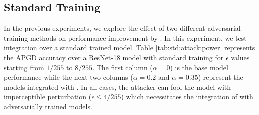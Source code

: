 \documentclass[conference]{IEEEtran}
\begin{document}
\begin{table}[tb]
\footnotesize
\caption{Clean and APGD accuracy of ResNet-18 model with GELU activation function over CIFAR-10 test set before (Base) and after integration with \sys technique for different value of $\alpha$ and adversarial training based on PGD \cite{tdlmm18} and TRADES \cite{zhang2019theoretically}}
\renewcommand{\arraystretch}{1.3}
\label{tab:type}
\centering
\setlength\tabcolsep{2pt}
\end{table}












\subsection{Standard Training}\label{abl:std}
In the previous experiments, we explore the effect of two different adversarial training methods on performance improvement by \sys. In this experiment, we test \sys integration over a standard trained model. Table \mbox{\ref{tab:std:attack:power}} represents the APGD accuracy over a ResNet-18 model with standard training for $\epsilon$ values starting from $1/255$ to $8/255$. The first column ($\alpha=0$) is the base model performance while the next two columns ($\alpha = 0.2$ and $\alpha=0.35$) represent the models integrated with \sys. In all cases, the attacker can fool the model with imperceptible perturbation ($\epsilon\leq 4/255$) which necessitates the integration of \sys with adversarially trained models.
\end{document}
